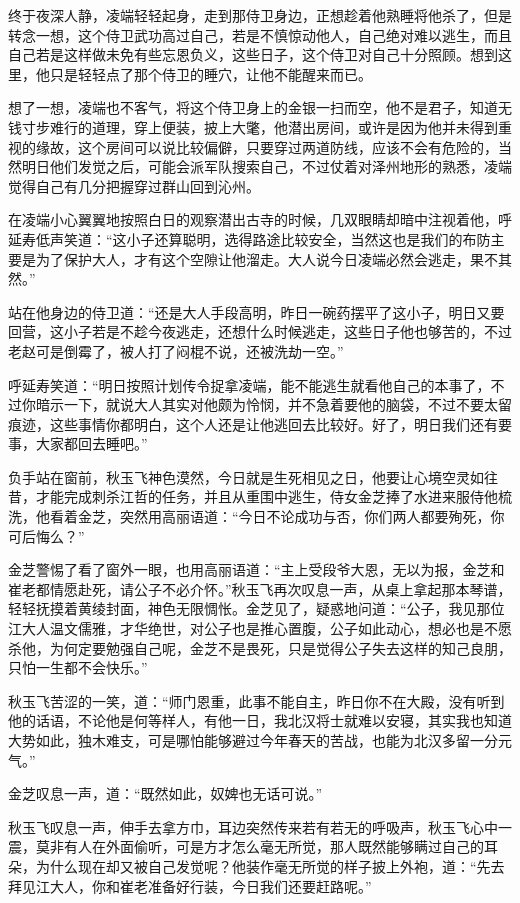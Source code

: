终于夜深人静，凌端轻轻起身，走到那侍卫身边，正想趁着他熟睡将他杀了，但是转念一想，这个侍卫武功高过自己，若是不慎惊动他人，自己绝对难以逃生，而且自己若是这样做未免有些忘恩负义，这些日子，这个侍卫对自己十分照顾。想到这里，他只是轻轻点了那个侍卫的睡穴，让他不能醒来而已。

想了一想，凌端也不客气，将这个侍卫身上的金银一扫而空，他不是君子，知道无钱寸步难行的道理，穿上便装，披上大氅，他潜出房间，或许是因为他并未得到重视的缘故，这个房间可以说比较偏僻，只要穿过两道防线，应该不会有危险的，当然明日他们发觉之后，可能会派军队搜索自己，不过仗着对泽州地形的熟悉，凌端觉得自己有几分把握穿过群山回到沁州。

在凌端小心翼翼地按照白日的观察潜出古寺的时候，几双眼睛却暗中注视着他，呼延寿低声笑道：“这小子还算聪明，选得路途比较安全，当然这也是我们的布防主要是为了保护大人，才有这个空隙让他溜走。大人说今日凌端必然会逃走，果不其然。”

站在他身边的侍卫道：“还是大人手段高明，昨日一碗药摆平了这小子，明日又要回营，这小子若是不趁今夜逃走，还想什么时候逃走，这些日子他也够苦的，不过老赵可是倒霉了，被人打了闷棍不说，还被洗劫一空。”

呼延寿笑道：“明日按照计划传令捉拿凌端，能不能逃生就看他自己的本事了，不过你暗示一下，就说大人其实对他颇为怜悯，并不急着要他的脑袋，不过不要太留痕迹，这些事情你都明白，这个人还是让他逃回去比较好。好了，明日我们还有要事，大家都回去睡吧。”

负手站在窗前，秋玉飞神色漠然，今日就是生死相见之日，他要让心境空灵如往昔，才能完成刺杀江哲的任务，并且从重围中逃生，侍女金芝捧了水进来服侍他梳洗，他看着金芝，突然用高丽语道：“今日不论成功与否，你们两人都要殉死，你可后悔么？”

金芝警惕了看了窗外一眼，也用高丽语道：“主上受段爷大恩，无以为报，金芝和崔老都情愿赴死，请公子不必介怀。”秋玉飞再次叹息一声，从桌上拿起那本琴谱，轻轻抚摸着黄绫封面，神色无限惆怅。金芝见了，疑惑地问道：“公子，我见那位江大人温文儒雅，才华绝世，对公子也是推心置腹，公子如此动心，想必也是不愿杀他，为何定要勉强自己呢，金芝不是畏死，只是觉得公子失去这样的知己良朋，只怕一生都不会快乐。”

秋玉飞苦涩的一笑，道：“师门恩重，此事不能自主，昨日你不在大殿，没有听到他的话语，不论他是何等样人，有他一日，我北汉将士就难以安寝，其实我也知道大势如此，独木难支，可是哪怕能够避过今年春天的苦战，也能为北汉多留一分元气。”

金芝叹息一声，道：“既然如此，奴婢也无话可说。”

秋玉飞叹息一声，伸手去拿方巾，耳边突然传来若有若无的呼吸声，秋玉飞心中一震，莫非有人在外面偷听，可是方才怎么毫无所觉，那人既然能够瞒过自己的耳朵，为什么现在却又被自己发觉呢？他装作毫无所觉的样子披上外袍，道：“先去拜见江大人，你和崔老准备好行装，今日我们还要赶路呢。”


